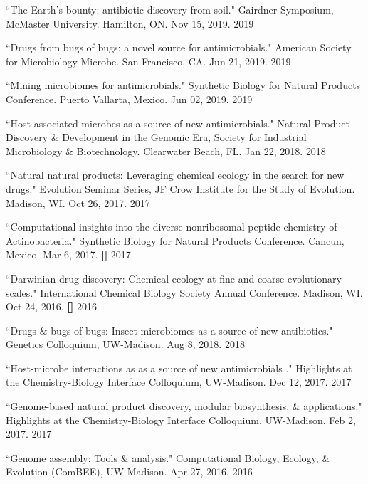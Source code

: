 \begin{cvpubs}

\cvpub
{``The Earth’s bounty: antibiotic discovery from soil." Gairdner Symposium, McMaster University. Hamilton, ON. Nov 15, 2019.}
{2019}

\cvpub
{``Drugs from bugs of bugs: a novel source for antimicrobials." American Society for Microbiology Microbe. San Francisco, CA. Jun 21, 2019.}
{2019}

\cvpub
{``Mining microbiomes for antimicrobials." Synthetic Biology for Natural Products Conference. Puerto Vallarta, Mexico. Jun 02, 2019.}
{2019}

\cvpub
{``Host-associated microbes as a source of new antimicrobials." Natural Product Discovery \& Development in the Genomic Era, Society for Industrial Microbiology \& Biotechnology. Clearwater Beach, FL. Jan 22, 2018.}
{2018}

\cvpub
{``Natural natural products: Leveraging chemical ecology in the search for new drugs." Evolution Seminar Series, JF Crow Institute for the Study of Evolution. Madison, WI. Oct 26, 2017.}
{2017}

\cvpub
{``Computational insights into the diverse nonribosomal peptide chemistry of Actinobacteria." Synthetic Biology for Natural Products Conference. Cancun, Mexico. Mar 6, 2017. \linebreak \textbf{[\textit{}]}}
{2017}

\cvpub
{``Darwinian drug discovery: Chemical ecology at fine and coarse evolutionary scales." International Chemical Biology Society Annual Conference. Madison, WI. Oct 24, 2016. \linebreak \textbf{[\textit{}]}}
{2016}

\end{cvpubs}


\begin{cvpubs} 

\cvpub
{``Drugs \& bugs of bugs: Insect microbiomes as a source of new antibiotics." Genetics Colloquium, UW-Madison. Aug 8, 2018.}
{2018}

\cvpub
{``Host-microbe interactions as as a source of new antimicrobials
." Highlights at the Chemistry-Biology Interface Colloquium, UW-Madison. Dec 12, 2017.}
{2017}

\cvpub
{``Genome-based natural product discovery, modular biosynthesis, \& applications." Highlights at the Chemistry-Biology Interface Colloquium, UW-Madison. Feb 2, 2017.}
{2017}

\cvpub
{``Genome assembly: Tools \& analysis." Computational Biology, Ecology, \& Evolution (ComBEE), UW-Madison. Apr 27, 2016.}
{2016}

\end{cvpubs}

